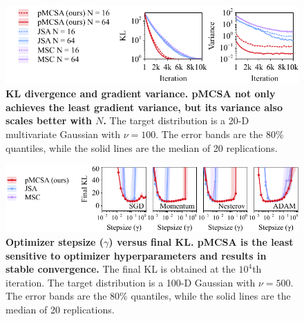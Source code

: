

\begin{figure}
  \vspace{-0.25in}
  \centering
  \includegraphics[scale=1.0]{figures/gaussian_02.pdf}
  \vspace{-0.07in}
  \caption{\textbf{
      KL divergence and gradient variance.
      pMCSA not only achieves the least gradient variance, but its variance also scales better with \(N\).
    }
    The target distribution is a 20-D multivariate Gaussian with \(\nu = 100\).
    The error bands are the 80\% quantiles, while the solid lines are the median of 20 replications.
  }\label{fig:gaussian}
\end{figure}
\begin{figure}
  \vspace{-0.13in}
  \centering
  \includegraphics[scale=1.0]{figures/stepsize_02.pdf}
  \caption{\textbf{Optimizer stepsize (\(\gamma\)) versus final KL.
      pMCSA is the least sensitive to optimizer hyperparameters and results in stable convergence.}
      The final KL is obtained at the \(10^4\)th iteration.
      The target distribution is a 100-D Gaussian with \(\nu = 500\).
      The error bands are the 80\% quantiles, while the solid lines are the median of 20 replications.
  }\label{fig:stepsize}
  \vspace{-0.15in}
\end{figure}

